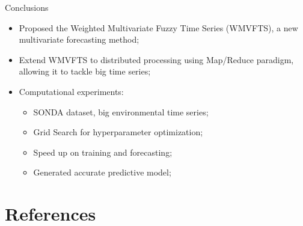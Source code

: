 \documentclass{beamer}
\begin{document}
\begin{frame}{Conclusions}
\begin{itemize}
\item Proposed the Weighted Multivariate Fuzzy Time Series (WMVFTS), a new multivariate forecasting method;
\item Extend WMVFTS to distributed processing using Map/Reduce paradigm, allowing it to tackle big time series;
\item Computational experiments:
\begin{itemize}
    \item SONDA dataset, big environmental time series;
    \item Grid Search for hyperparameter optimization;
    \item Speed up on training and forecasting;
    \item Generated accurate predictive model;
\end{itemize}
\end{itemize}
\end{frame}


\section{References}



\end{document}
